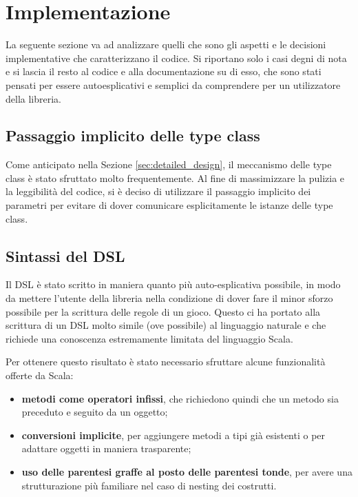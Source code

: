 \section{Implementazione}

La seguente sezione va ad analizzare quelli che sono gli aspetti e le decisioni implementative che caratterizzano il codice.
%
Si riportano solo i casi degni di nota e si lascia il resto al codice e alla documentazione su di esso, che sono stati pensati per essere autoesplicativi e semplici da comprendere per un utilizzatore della libreria.


\subsection{Passaggio implicito delle type class}

Come anticipato nella Sezione \ref{sec:detailed_design}, il meccanismo delle type class è stato sfruttato molto frequentemente.
%
Al fine di massimizzare la pulizia e la leggibilità del codice, si è deciso di utilizzare il passaggio implicito dei parametri per evitare di dover comunicare esplicitamente le istanze delle type class.


\subsection{Sintassi del DSL}\label{sec:dsl_syntax}

Il DSL è stato scritto in maniera quanto più auto-esplicativa possibile, in modo da mettere l'utente della libreria nella condizione di dover fare il minor sforzo possibile per la scrittura delle regole di un gioco.
%
Questo ci ha portato alla scrittura di un DSL molto simile (ove possibile) al linguaggio naturale e che richiede una conoscenza estremamente limitata del linguaggio Scala.

Per ottenere questo risultato è stato necessario sfruttare alcune funzionalità offerte da Scala:
\begin{itemize}
  \item \textbf{metodi come operatori infissi}, che richiedono quindi che un metodo sia preceduto e seguito da un oggetto;
  \item \textbf{conversioni implicite}, per aggiungere metodi a tipi già esistenti o per adattare oggetti in maniera trasparente;
  \item \textbf{uso delle parentesi graffe al posto delle parentesi tonde}, per avere una strutturazione più familiare nel caso di nesting dei costrutti.
\end{itemize}

